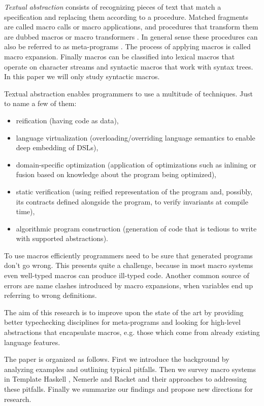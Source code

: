 \documentclass[10pt,journal,a4paper]{IEEEtran}
\begin{document}
\emph{Textual abstraction} consists of recognizing pieces of text
that match a specification and replacing them according
to a procedure.
Matched fragments are called macro calls or macro applications, and
procedures that transform them are dubbed macros or macro transformers \cite{kohlbecker86}.
In general sense these procedures can also be referred to as meta-programs \cite{sheard01}.
The process of applying macros is called macro expansion.
Finally macros can be classified into lexical macros that
operate on character streams and syntactic macros that work with syntax trees.
In this paper we will only study syntactic macros.

Textual abstraction enables programmers to use a multitude of techniques.
Just to name a few of them:
\begin{itemize}
\item reification (having code as data),
\item language virtualization (overloading/overriding language semantics
to enable deep embedding of DSLs),
\item domain-specific optimization (application of optimizations such as inlining
or fusion based on knowledge about the program being optimized),
\item static verification (using reified representation of the program
and, possibly, its contracts defined alongside the program, to verify invariants
at compile time),
\item algorithmic program construction (generation of code that is tedious to write with
supported abstractions).
\end{itemize}

To use macros efficiently programmers need to be sure that generated programs don't go wrong.
This presents quite a challenge, because in most macro systems even well-typed macros
can produce ill-typed code. Another common source of errors are name clashes introduced
by macro expansions, when variables end up referring to wrong definitions.

The aim of this research is to improve upon the state of the art by providing better typechecking
disciplines for meta-programs and looking for high-level abstractions that encapsulate macros,
e.g. those which come from already existing language features.

The paper is organized as follows. First we introduce the background by analyzing examples
and outlining typical pitfalls. Then we survey
macro systems in Template Haskell \cite{sheard02}, Nemerle \cite{skalski04} and Racket \cite{barzilay11}
and their approaches to addressing these pitfalls. Finally we summarize our findings
and propose new directions for research.
\end{document}
